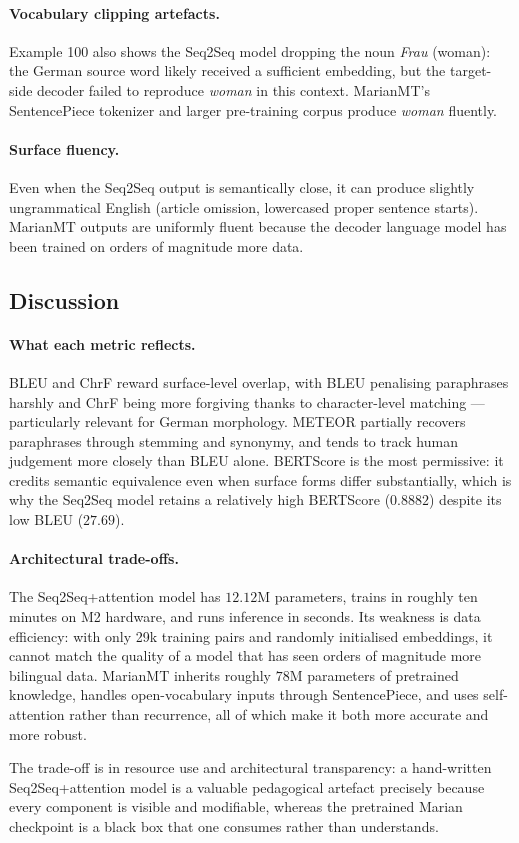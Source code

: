 \paragraph{Vocabulary clipping artefacts.}
Example 100 also shows the Seq2Seq model dropping the noun
\textit{Frau} (woman): the German source word likely received a
sufficient embedding, but the target-side decoder failed to reproduce
\textit{woman} in this context. MarianMT's SentencePiece tokenizer and
larger pre-training corpus produce \textit{woman} fluently.

\paragraph{Surface fluency.}
Even when the Seq2Seq output is semantically close, it can produce
slightly ungrammatical English (article omission, lowercased proper
sentence starts). MarianMT outputs are uniformly fluent because the
decoder language model has been trained on orders of magnitude more
data.

\subsection{Discussion}

\paragraph{What each metric reflects.}
BLEU and ChrF reward surface-level overlap, with BLEU penalising
paraphrases harshly and ChrF being more forgiving thanks to
character-level matching --- particularly relevant for German
morphology. METEOR partially recovers paraphrases through stemming and
synonymy, and tends to track human judgement more closely than BLEU
alone. BERTScore is the most permissive: it credits semantic
equivalence even when surface forms differ substantially, which is why
the Seq2Seq model retains a relatively high BERTScore ($0.8882$)
despite its low BLEU ($27.69$).

\paragraph{Architectural trade-offs.}
The Seq2Seq+attention model has $12.12$M parameters, trains in roughly
ten minutes on M2 hardware, and runs inference in seconds. Its weakness
is data efficiency: with only 29k training pairs and randomly
initialised embeddings, it cannot match the quality of a model that has
seen orders of magnitude more bilingual data. MarianMT inherits roughly
$78$M parameters of pretrained knowledge, handles open-vocabulary
inputs through SentencePiece, and uses self-attention rather than
recurrence, all of which make it both more accurate and more robust.

The trade-off is in resource use and architectural transparency: a
hand-written Seq2Seq+attention model is a valuable pedagogical artefact
precisely because every component is visible and modifiable, whereas
the pretrained Marian checkpoint is a black box that one consumes
rather than understands.